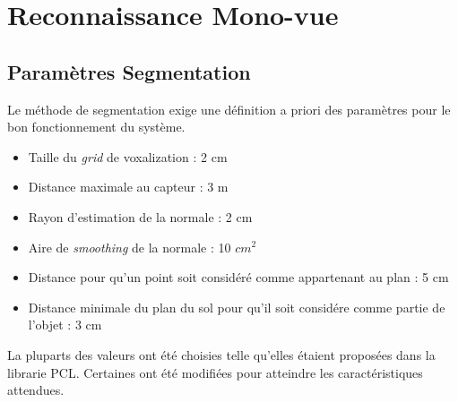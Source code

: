 %

 
\chapter{Reconnaissance Mono-vue} 
\section{Paramètres Segmentation}
\label{annexe:segmentation}
Le méthode de segmentation exige une définition a priori des paramètres pour le bon fonctionnement du système.
\begin{itemize}
\item Taille du \textit{grid} de voxalization : 2 cm
\item Distance maximale au capteur : 3 m
\item Rayon d'estimation de la normale : 2 cm
\item Aire de \textit{smoothing} de la normale : 10 $cm^2$
\item Distance pour qu'un point soit considéré comme appartenant au plan : 5 cm
\item Distance minimale du plan du sol pour qu'il soit considére comme partie de l'objet : 3 cm
\end{itemize}

La pluparts des valeurs ont été choisies telle qu'elles étaient proposées dans la librarie PCL. Certaines ont été modifiées pour atteindre les caractéristiques attendues.

